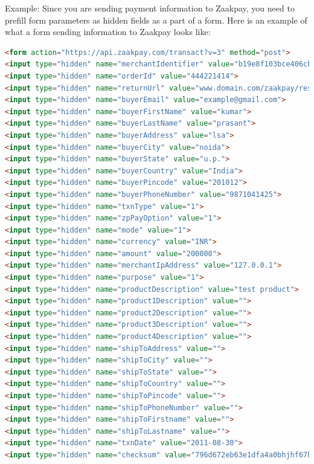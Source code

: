 \documentclass{article}
\begin{document}
\newpage
Example:
Since you are sending payment information to Zaakpay, you need to prefill form parameters as hidden
fields as a part of a form. Here is an example of what a form sending information to Zaakpay looks
like:
\begin{lstlisting}[language=html,breaklines=true]
<form action="https://api.zaakpay.com/transact?v=3" method="post">
<input type="hidden" name="merchantIdentifier" value="b19e8f103bce406cbd">
<input type="hidden" name="orderId" value="444221414">
<input type="hidden" name="returnUrl" value="www.domain.com/zaakpay/response">
<input type="hidden" name="buyerEmail" value="example@gmail.com">
<input type="hidden" name="buyerFirstName" value="kumar">
<input type="hidden" name="buyerLastName" value="prasant">
<input type="hidden" name="buyerAddress" value="lsa">
<input type="hidden" name="buyerCity" value="noida">
<input type="hidden" name="buyerState" value="u.p.">
<input type="hidden" name="buyerCountry" value="India">
<input type="hidden" name="buyerPincode" value="201012">
<input type="hidden" name="buyerPhoneNumber" value="9871041425">
<input type="hidden" name="txnType" value="1">
<input type="hidden" name="zpPayOption" value="1">
<input type="hidden" name="mode" value="1">
<input type="hidden" name="currency" value="INR">
<input type="hidden" name="amount" value="200000">
<input type="hidden" name="merchantIpAddress" value="127.0.0.1">
<input type="hidden" name="purpose" value="1">
<input type="hidden" name="productDescription" value="test product">
<input type="hidden" name="product1Description" value="">
<input type="hidden" name="product2Description" value="">
<input type="hidden" name="product3Description" value="">
<input type="hidden" name="product4Description" value="">
<input type="hidden" name="shipToAddress" value="">
<input type="hidden" name="shipToCity" value="">
<input type="hidden" name="shipToState" value="">
<input type="hidden" name="shipToCountry" value="">
<input type="hidden" name="shipToPincode" value="">
<input type="hidden" name="shipToPhoneNumber" value="">
<input type="hidden" name="shipToFirstname" value="">
<input type="hidden" name="shipToLastname" value="">
<input type="hidden" name="txnDate" value="2011-08-30">
<input type="hidden" name="checksum" value="796d672eb63e1dfa4a0bhjhf67hkh98"> </form>
\end{lstlisting}
 
\end{document}
